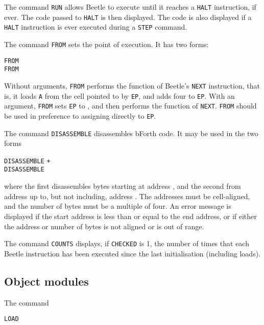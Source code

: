 The command {\tt RUN} allows Beetle to execute until it reaches a {\tt HALT}
instruction, if ever. The code passed to {\tt HALT} is then displayed. The
code is also displayed if a {\tt HALT} instruction is ever executed during a
{\tt STEP} command.

\label{from}
The command {\tt FROM} sets the point of execution. It has two forms:

\begin{center}
{\tt FROM}\\
{\tt FROM} 
\end{center}

Without arguments, {\tt FROM} performs the function of Beetle's {\tt NEXT}
instruction, that is, it loads {\tt A} from the cell pointed to by {\tt EP},
and adds four to {\tt EP}. With an argument, {\tt FROM} sets {\tt EP} to
, and then performs the function of {\tt NEXT}. {\tt FROM}
should be used in preference to assigning directly to {\tt EP}.

The command {\tt DISASSEMBLE} disassembles bForth code. It may be used in the
two forms

\begin{center}
{\tt DISASSEMBLE}  \tt{+} \\
{\tt DISASSEMBLE}  
\end{center}

where the first disassembles  bytes starting at address
, and the second from address  up to, but not
including, address . The addresses must be cell-aligned, and
the number of bytes must be a multiple of four. An error message is displayed
if the start address is less than or equal to the end address, or if either
the address or number of bytes is not aligned or is out of range.

The command {\tt COUNTS} displays, if {\tt CHECKED} is 1, the number of times
that each Beetle instruction has been executed since the last initialisation
(including loads).

\subsection{Object modules}

The command

\label{uifaceload}
\begin{center}{\tt LOAD}  \end{center}


